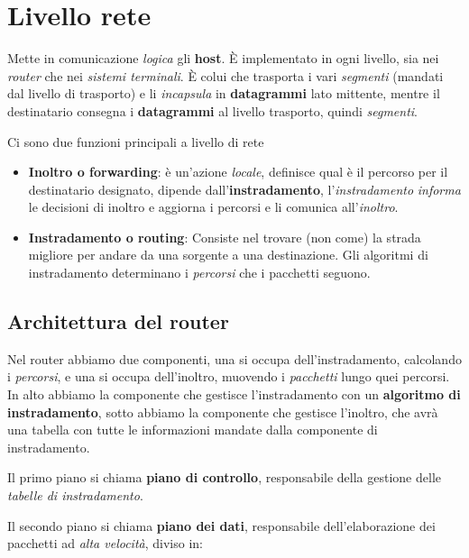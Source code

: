 \section{Livello rete}
Mette in comunicazione \textit{logica} gli \textbf{host}. È implementato in ogni livello, sia nei \textit{router} che nei \textit{sistemi terminali}. È colui che trasporta i vari \textit{segmenti} (mandati dal livello di trasporto) e li \textit{incapsula} in \textbf{datagrammi} lato mittente, mentre il destinatario consegna i \textbf{datagrammi} al livello trasporto, quindi \textit{segmenti}.

Ci sono due funzioni principali a livello di rete
\begin{itemize}
  \item \textbf{Inoltro o forwarding}: è un'azione \textit{locale}, definisce qual è il percorso per il destinatario designato, dipende dall'\textbf{instradamento}, l'\textit{instradamento} \textit{informa} le decisioni di inoltro e aggiorna i percorsi e li comunica all'\textit{inoltro}.
  \item \textbf{Instradamento o routing}: Consiste nel trovare (non come) la strada migliore per andare da una sorgente a una destinazione. Gli algoritmi di instradamento determinano i \textit{percorsi} che i pacchetti seguono.
\end{itemize}

\subsection{Architettura del router}
Nel router abbiamo due componenti, una si occupa dell'instradamento, calcolando i \textit{percorsi}, e una si occupa dell'inoltro, muovendo i \textit{pacchetti} lungo quei percorsi. In alto abbiamo la componente che gestisce l'instradamento con un \textbf{algoritmo di instradamento}, sotto abbiamo la componente che gestisce l'inoltro, che avrà una tabella con tutte le informazioni mandate dalla componente di instradamento.

Il primo piano si chiama \textbf{piano di controllo}, responsabile della gestione delle \textit{tabelle di instradamento}.

Il secondo piano si chiama \textbf{piano dei dati}, responsabile dell'elaborazione dei pacchetti ad \textit{alta velocità}, diviso in:

